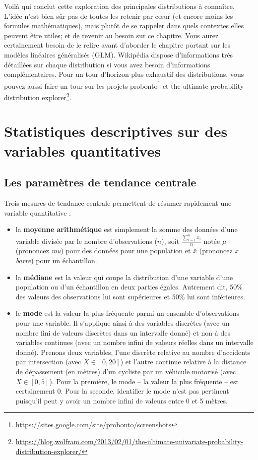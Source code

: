 \documentclass[
  11pt,
  french,
]{book}
\providecommand{\tightlist}{%
  \setlength{\itemsep}{0pt}\setlength{\parskip}{0pt}}
\renewcommand{\href}[2]{#2\footnote{\url{#1}}}
\begin{document}
Voilà qui conclut cette exploration des principales distributions à connaître. L'idée n'est bien sûr pas de toutes les retenir par cœur (et encore moins les formules mathématiques), mais plutôt de se rappeler dans quels contextes elles peuvent être utiles; et de revenir au besoin sur ce chapitre. Vous aurez certainement besoin de le relire avant d'aborder le chapitre portant sur les modèles linéaires généralisés (GLM).
Wikipédia dispose d'informations très détaillées sur chaque distribution si vous avez besoin d'informations complémentaires. Pour un tour d'horizon plus exhaustif des distributions, vous pouvez aussi faire un tour sur les projets \href{https://sites.google.com/site/probonto/screenshots}{probonto} et \href{https://blog.wolfram.com/2013/02/01/the-ultimate-univariate-probability-distribution-explorer/}{the ultimate probability distribution explorer}.

\hypertarget{sect025}{%
\section{Statistiques descriptives sur des variables quantitatives}\label{sect025}}

\hypertarget{sect0251}{%
\subsection{Les paramètres de tendance centrale}\label{sect0251}}

Trois mesures de tendance centrale permettent de résumer rapidement une variable quantitative :

\begin{itemize}
\tightlist
\item
  la \textbf{moyenne arithmétique} est simplement la somme des données d'une variable divisée par le nombre d'observations (\(n\)), soit \(\frac{\sum_{i=1}^n x_i}{n}\) notée \(\mu\) (prononcez \emph{mu}) pour des données pour une population et \(\bar{x}\) (prononcez \emph{x barre}) pour un échantillon.
\item
  la \textbf{médiane} est la valeur qui coupe la distribution d'une variable d'une population ou d'un échantillon en deux parties égales. Autrement dit, 50\% des valeurs des observations lui sont supérieures et 50\% lui sont inférieures.
\item
  le \textbf{mode} est la valeur la plus fréquente parmi un ensemble d'observations pour une variable. Il s'applique ainsi à des variables discrètes (avec un nombre fini de valeurs discrètes dans un intervalle donné) et non à des variables continues (avec un nombre infini de valeurs réelles dans un intervalle donné). Prenons deux variables, l'une discrète relative au nombre d'accidents par intersection (avec \(X \in \left[0,20\right]\)) et l'autre continue relative à la distance de dépassement (en mètres) d'un cycliste par un véhicule motorisé (avec \(X \in \left[0,5\right]\)). Pour la première, le mode -- la valeur la plus fréquente -- est certainement 0. Pour la seconde, identifier le mode n'est pas pertinent puisqu'il peut y avoir un nombre infini de valeurs entre 0 et 5 mètres.
\end{itemize}
\end{document}
